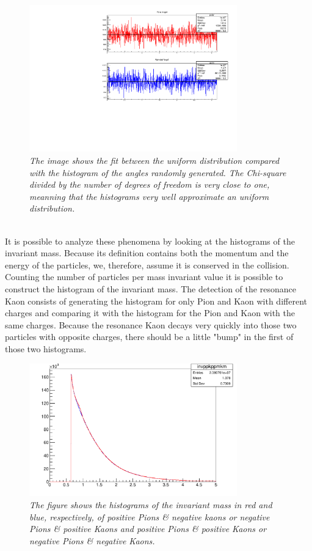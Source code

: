 \documentclass[a4paper, 11pt]{article}
\begin{document}
    \begin{figure}
      \includegraphics[width=9cm]{c2.pdf}
      \caption{\label{f2} \textit{The image shows the fit between the uniform distribution compared with the histogram of the angles randomly generated. The Chi-square divided by the number of degrees of freedom is very close to one, meanning that the histograms very well approximate an uniform distribution.}}
    \end{figure}
    \\
    It is possible to analyze these phenomena by looking at the histograms of the invariant mass. Because its definition contains both the momentum and the energy of the particles, we, therefore, assume it is conserved in the collision. Counting the number of particles per mass invariant value it is possible to construct the histogram of the invariant mass. The detection of the resonance Kaon consists of generating the histogram for only Pion and Kaon with different charges and comparing it with the histogram for the Pion and Kaon with the same charges. Because the resonance Kaon decays very quickly into those two particles with opposite charges, there should be a little "bump" in the first of those two histograms.
    \begin{figure}[h!]
      \centering
      \includegraphics[width=9cm]{c4.pdf}
      \caption{\label{f3} \textit{The figure shows the histograms of the invariant mass in red and blue, respectively, of positive Pions \& negative kaons or negative Pions \& positive Kaons and positive Pions \& positive Kaons or negative Pions \& negative Kaons.}}
    \end{figure}\\
\end{document}
